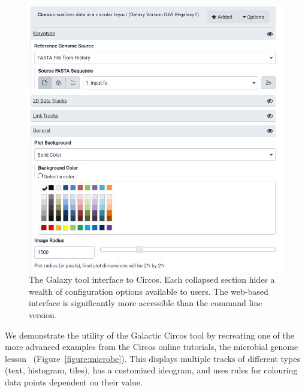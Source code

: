 \begin{figure}[h!]
\centering
\includegraphics[width=0.8\linewidth]{chapters/images/circos/circos-galaxy-ui.png}
\caption{The Galaxy tool interface to Circos. Each collapsed section hides a wealth of configuration options available to users. The web-based interface is significantly more accessible than the command line version.}\label{figure:userinterface}
\end{figure}

We demonstrate the utility of the Galactic Circos tool by recreating one of the more advanced examples from the Circos online tutorials, the microbial genome lesson~\cite{circos-microbial-example} (Figure~\ref{figure:microbe}). This displays multiple tracks of different types (text, histogram, tiles), has a customized ideogram, and uses rules for colouring data points dependent on their value.

